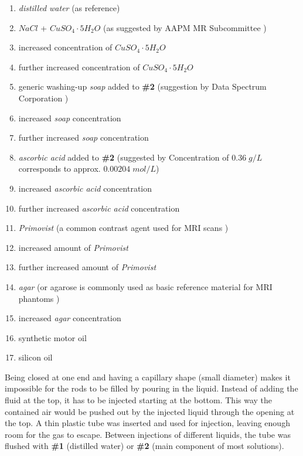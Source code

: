 \newpage
\begin{enumerate}[label=\textbf{\#\arabic*}]
 \item \textit{distilled water} (as reference)
 \item $NaCl$ + $CuSO_4\cdot5H_2O$ (as suggested by AAPM MR Subcommittee \cite{Jackson2009})
 \item increased concentration of $CuSO_4\cdot5H_2O$
 \item further increased concentration of $CuSO_4\cdot5H_2O$
 \item generic washing-up \textit{soap} added to \textbf{\#2} (suggestion by Data Spectrum Corporation \cite{bubbles})
 \item increased \textit{soap} concentration
 \item further increased \textit{soap} concentration
 \item \textit{ascorbic acid} added to \textbf{\#2} (suggested by \cite{Abtahi2008, Bodannes1979} Concentration of $0.36 \; g/L$ corresponds to approx. $0.00204 \; mol/L$)
 \item increased \textit{ascorbic acid} concentration
 \item further increased \textit{ascorbic acid} concentration
 \item \textit{Primovist} (a common contrast agent used for MRI scans \cite{VanBeers2012, Rohrer, primovist})
 \item increased amount of \textit{Primovist}
 \item further increased amount of \textit{Primovist}
 \item \textit{agar} (or agarose is commonly used as basic reference material for MRI phantoms \cite{BuccioliniCiraolo1989, Mathur-DeVre1985})
 \item increased \textit{agar} concentration
 \item synthetic motor oil
 \item silicon oil
\end{enumerate}


Being closed at one end and having a capillary shape (small diameter) makes it impossible for the rods to be filled by pouring in the liquid.
Instead of adding the fluid at the top, it has to be injected starting at the bottom.
This way the contained air would be pushed out by the injected liquid through the opening at the top.
A thin plastic tube was inserted and used for injection, leaving enough room for the gas to escape.
Between injections of different liquids, the tube was flushed with \textbf{\#1} (distilled water) or \textbf{\#2} (main component of most solutions).

